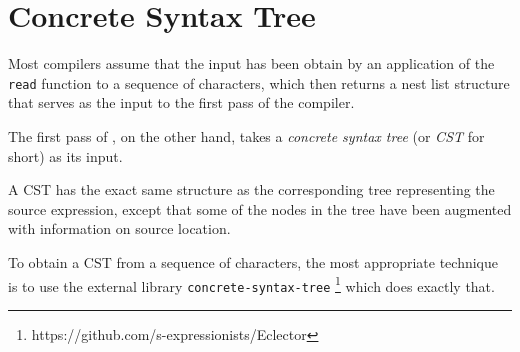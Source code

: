 \chapter{Concrete Syntax Tree}

Most \commonlisp{} compilers assume that the input has been obtain by
an application of the \commonlisp{} \texttt{read} function to a
sequence of characters, which then returns a nest list structure that
serves as the input to the first pass of the compiler.

The first pass of \sysname{}, on the other hand, takes a
\emph{concrete syntax tree} (or \emph{CST} for short) as its input.  

A CST has the exact same structure as the corresponding tree
representing the source expression, except that some of the nodes in
the tree have been augmented with information on source location.

To obtain a CST from a sequence of characters, the most appropriate
technique is to use the external library
\texttt{concrete-syntax-tree}%
\footnote{https://github.com/s-expressionists/Eclector}
which does exactly that.



